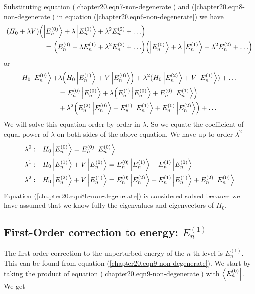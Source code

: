 Substituting equation (\ref{chapter20.eqn7-non-degenerate}) and (\ref{chapter20.eqn8-non-degenerate}) in equation (\ref{chapter20.eqn6-non-degenerate}) we have
\begin{align*}
\qty(H_0 + \lambda V)\qty(\ket{E_n^{(0)}} + \lambda \ket{E_n^{(1)}} + \lambda^2 E_n^{(2)} + \ldots)& \\
= \qty(E_n^{(0)} + \lambda E_n^{(1)} + \lambda^2 E_n^{(2)} + \ldots)
&\qty(\ket{E_n^{(0)}} + \lambda \ket{E_n^{(1)}}
+ \lambda^2 E_n^{(2)} + \ldots)
\end{align*}
or
\begin{align*}
H_0 \ket{E_n^{(0)}} + &\lambda \qty(H_0 \ket{E_n^{(1)}}  + V\ket{E_n^{(0)}})  + \lambda^2(H_0 \ket{E_n^{(2)}} + V\ket{E_n^{(1)}}) + \ldots  \\
&= E_n^{(0)} \ket{E_n^{(0)}} + \lambda\qty(E_n^{(1)}\ket{E_n^{(0)}} + E_n^{(0)}\ket{E_n^{(1)}})  \\
&+ \lambda^2 \qty(E_n^{(2)} \ket{E_n^{(0)}}  + E_n^{(1)}\ket{E_n^{(1)}}  +  E_n^{(0)}\ket{E_n^{(2)}}) + \ldots
\end{align*}
We will solve this equation order by order in $\lambda$. So we equate the coefficient of equal power of $\lambda$ on both sides of the above equation. We  have up to order $\lambda^2$
\begin{align}
\label{chapter20.eqn8b-non-degenerate}
\lambda^0 : \quad &  H_0 \ket{E_{n}^{(0)}} = E_n^{(0)}\ket{E_{n}^{(0)}} \\
\label{chapter20.eqn9-non-degenerate}
\lambda^1 : \quad & H_0\ket{E_{n}^{(1)}} + V\ket{E_{n}^{(0)}} = E_n^{(0)}\ket{E_{n}^{(1)}} + E_n^{(1)}\ket{E_{n}^{(0)}} \\
\label{chapter20.eqn10-non-degenerate}
\lambda^2 : \quad & H_0\ket{E_n^{(2)}} + V\ket{E_{n}^{(1)}} = E_n^{(0)}\ket{E_{n}^{(2)}} + E_{n}^{(1)}\ket{E_{n}^{(1)}}  + E_{n}^{(2)}\ket{E_{n}^{(0)}}
\end{align}
Equation (\ref{chapter20.eqn8b-non-degenerate}) is considered solved because we have assumed that we know fully the eigenvalues and eigenvectors of $H_0$.

\subsection{First-Order correction to energy: $E_n^{(1)}$}
The first order correction to the unperturbed energy of the $n$-th level is $E_n^{(1)}$. This can be found from equation (\ref{chapter20.eqn9-non-degenerate}). We start by taking the product of equation (\ref{chapter20.eqn9-non-degenerate}) with $\bra{E_n^{(0)}}$. We get

